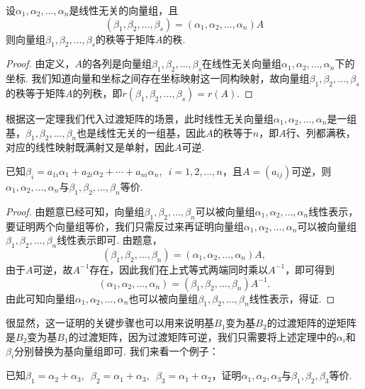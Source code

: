 \begin{theorem}{}{}
    设$\alpha_1,\alpha_2,\ldots,\alpha_n$是线性无关的向量组，且
    \[(\beta_1,\beta_2,\ldots,\beta_s)=(\alpha_1,\alpha_2,\ldots,\alpha_n)A\]
    则向量组$\beta_1,\beta_2,\ldots,\beta_s$的秩等于矩阵$A$的秩.
\end{theorem}

\begin{proof}
    由定义，$A$的各列是向量组$\beta_1,\beta_2,\ldots,\beta_s$在线性无关向量组$\alpha_1,\alpha_2,\ldots,\alpha_n$下的坐标. 我们知道向量和坐标之间存在坐标映射这一同构映射，故向量组$\beta_1,\beta_2,\ldots,\beta_s$的秩等于矩阵$A$的列秩，即$r(\beta_1,\beta_2,\ldots,\beta_s)=r(A)$.
\end{proof}

根据这一定理我们代入过渡矩阵的场景，此时线性无关向量组$\alpha_1,\alpha_2,\ldots,\alpha_n$是一组基，$\beta_1,\beta_2,\ldots,\beta_n$也是线性无关的一组基，因此$A$的秩等于$n$，即$A$行、列都满秩，对应的线性映射既满射又是单射，因此$A$可逆.
\begin{theorem}{}{}
    已知$\beta_i=a_{1i}\alpha_1+a_{2i}\alpha_2+\cdots+a_{ni}\alpha_n,\enspace i=1,2,\ldots,n$，且$A=(a_{ij})$可逆，则$\alpha_1,\alpha_2,\ldots,\alpha_n$与$\beta_1,\beta_2,\ldots,\beta_n$等价.
\end{theorem}

\begin{proof}
    由题意已经可知，向量组$\beta_1,\beta_2,\ldots,\beta_n$可以被向量组$\alpha_1,\alpha_2,\ldots,\alpha_n$线性表示，要证明两个向量组等价，我们只需反过来再证明向量组$\alpha_1,\alpha_2,\ldots,\alpha_n$可以被向量组$\beta_1,\beta_2,\ldots,\beta_n$线性表示即可. 由题意，
    \[(\beta_1,\beta_2,\ldots,\beta_n)=(\alpha_1,\alpha_2,\ldots,\alpha_n)A,\]
    由于$A$可逆，故$A^{-1}$存在，因此我们在上式等式两端同时乘以$A^{-1}$，即可得到
    \[(\alpha_1,\alpha_2,\ldots,\alpha_n)=(\beta_1,\beta_2,\ldots,\beta_n)A^{-1}.\]
    由此可知向量组$\alpha_1,\alpha_2,\ldots,\alpha_n$也可以被向量组$\beta_1,\beta_2,\ldots,\beta_n$线性表示，得证.
\end{proof}

很显然，这一证明的关键步骤也可以用来说明基$B_1$变为基$B_2$的过渡矩阵的逆矩阵是$B_2$变为基$B_1$的过渡矩阵，因为过渡矩阵可逆，我们只需要将上述定理中的$\alpha_i$和$\beta_i$分别替换为基向量组即可. 我们来看一个例子：
\begin{example}{}{}
    已知$\beta_1=\alpha_2+\alpha_3,\enspace\beta_2=\alpha_1+\alpha_3,\enspace\beta_3=\alpha_1+\alpha_2$，证明$\alpha_1,\alpha_2,\alpha_3$与$\beta_1,\beta_2,\beta_3$等价.
\end{example}


